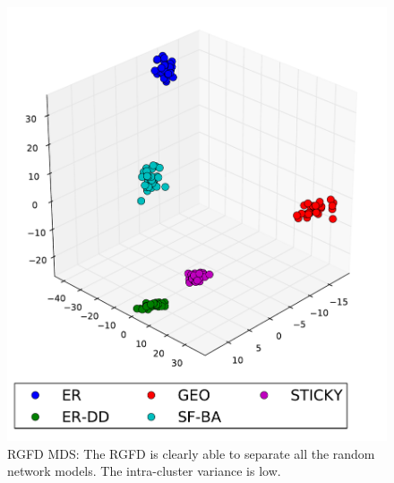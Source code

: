 \begin{figure}[H]
  \captionsetup{width=8cm}
  \hspace{-2.0em}
  \begin{minipage}[b]{0.55\linewidth}
    \centering
    \includegraphics[scale=0.45]
    {../code/final_results/trade_2010_thresholded/eval_results/rgfd_mds.pdf}
    \caption[Relative Graphlet Frequency distance MDS]{RGFD MDS: The RGFD is clearly able to separate all the random network models. The intra-cluster variance is low.}
    \label{fig:gfv_mds}
  \end{minipage}%
  \begin{minipage}[b]{0.55\linewidth}
    \centering

\end{minipage}
\end{figure}
